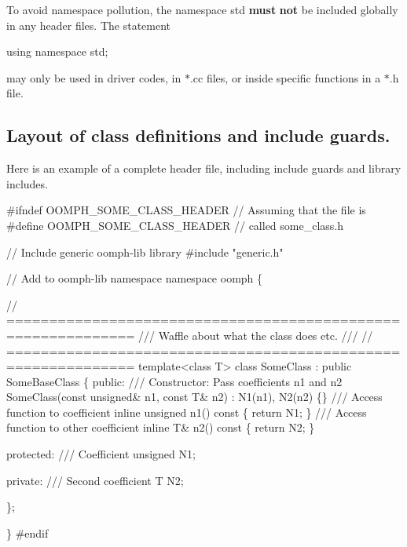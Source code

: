 \begin{DoxyItemize}
\item To avoid namespace pollution, the namespace {\ttfamily std} {\bfseries must} {\bfseries not} be included globally in any header files. The statement 
\begin{DoxyCode}
\textcolor{keyword}{using namespace }std;
\end{DoxyCode}
 may only be used in driver codes, in $\ast$.cc files, or inside specific functions in a $\ast$.h file.
\end{DoxyItemize}\hypertarget{index_layout_classes}{}\subsection{Layout of class definitions and include guards.}\label{index_layout_classes}
Here is an example of a complete header file, including include guards and library includes. 
\begin{DoxyCode}
\textcolor{preprocessor}{#ifndef OOMPH\_SOME\_CLASS\_HEADER     // Assuming that the file is }
\textcolor{preprocessor}{#define OOMPH\_SOME\_CLASS\_HEADER     // called some\_class.h}

\textcolor{comment}{// Include generic oomph-lib library}
\textcolor{preprocessor}{#include "generic.h"}

\textcolor{comment}{// Add to oomph-lib namespace}
\textcolor{keyword}{namespace }oomph
\{

\textcolor{comment}{// =============================================================}\textcolor{comment}{}
\textcolor{comment}{/// Waffle about what the class does etc.}
\textcolor{comment}{/// }
\textcolor{comment}{}\textcolor{comment}{// =============================================================}
\textcolor{keyword}{template}<\textcolor{keyword}{class} T>
\textcolor{keyword}{class }SomeClass : \textcolor{keyword}{public} SomeBaseClass
 \{
   \textcolor{keyword}{public}: 
\textcolor{comment}{}
\textcolor{comment}{    /// Constructor: Pass coefficients n1 and n2}
\textcolor{comment}{}    SomeClass(\textcolor{keyword}{const} \textcolor{keywordtype}{unsigned}& n1, \textcolor{keyword}{const} T& n2) : N1(n1), N2(n2)
     \{\}
\textcolor{comment}{}
\textcolor{comment}{    /// Access function to coefficient }
\textcolor{comment}{}    \textcolor{keyword}{inline} \textcolor{keywordtype}{unsigned} n1()\textcolor{keyword}{ const}
\textcolor{keyword}{     }\{
      \textcolor{keywordflow}{return} N1;
     \}
\textcolor{comment}{}
\textcolor{comment}{    /// Access function to other coefficient}
\textcolor{comment}{}    \textcolor{keyword}{inline} T& n2()\textcolor{keyword}{ const}
\textcolor{keyword}{     }\{
      \textcolor{keywordflow}{return} N2;
     \}
   

   \textcolor{keyword}{protected}:
\textcolor{comment}{}
\textcolor{comment}{      /// Coefficient }
\textcolor{comment}{}      \textcolor{keywordtype}{unsigned} N1;

   \textcolor{keyword}{private}:
\textcolor{comment}{}
\textcolor{comment}{      /// Second coefficient}
\textcolor{comment}{}      T  N2;

  \};

 \} 
\textcolor{preprocessor}{ #endif}
\end{DoxyCode}

